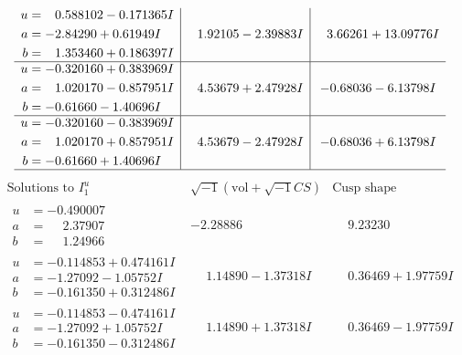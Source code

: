 \documentclass[1p]{elsarticle_modified}
\theoremstyle{definition}
\newcommand{\I}{\sqrt{-1}}
\begin{document}
$$\begin{array}{c|c|c}
\begin{aligned}
u &= \phantom{-}0.588102 - 0.171365 I \\
a &= -2.84290 + 0.61949 I \\
b &= \phantom{-}1.353460 + 0.186397 I\end{aligned}
 & \phantom{-}1.92105 - 2.39883 I & \phantom{-}3.66261 + 13.09776 I \\ \hline\begin{aligned}
u &= -0.320160 + 0.383969 I \\
a &= \phantom{-}1.020170 - 0.857951 I \\
b &= -0.61660 - 1.40696 I\end{aligned}
 & \phantom{-}4.53679 + 2.47928 I & -0.68036 - 6.13798 I \\ \hline\begin{aligned}
u &= -0.320160 - 0.383969 I \\
a &= \phantom{-}1.020170 + 0.857951 I \\
b &= -0.61660 + 1.40696 I\end{aligned}
 & \phantom{-}4.53679 - 2.47928 I & -0.68036 + 6.13798 I\\
 \hline 
 \end{array}$$\newpage$$\begin{array}{c|c|c}  
\text{Solutions to }I^u_{1}& \I (\text{vol} + \sqrt{-1}CS) & \text{Cusp shape}\\
 \hline 
\begin{aligned}
u &= -0.490007\phantom{ +0.000000I} \\
a &= \phantom{-}2.37907\phantom{ +0.000000I} \\
b &= \phantom{-}1.24966\phantom{ +0.000000I}\end{aligned}
 & -2.28886\phantom{ +0.000000I} & \phantom{-}9.23230\phantom{ +0.000000I} \\ \hline\begin{aligned}
u &= -0.114853 + 0.474161 I \\
a &= -1.27092 - 1.05752 I \\
b &= -0.161350 + 0.312486 I\end{aligned}
 & \phantom{-}1.14890 - 1.37318 I & \phantom{-}0.36469 + 1.97759 I \\ \hline\begin{aligned}
u &= -0.114853 - 0.474161 I \\
a &= -1.27092 + 1.05752 I \\
b &= -0.161350 - 0.312486 I\end{aligned}
 & \phantom{-}1.14890 + 1.37318 I & \phantom{-}0.36469 - 1.97759 I \\ \hline\begin{aligned}

\end{aligned}
\end{array}$$
\end{document}
